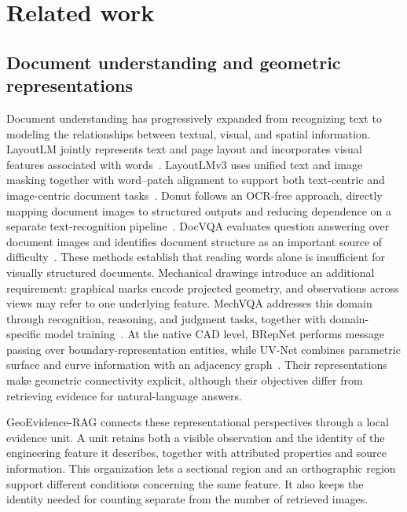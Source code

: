 \documentclass[preprint,12pt]{elsarticle}
\begin{document}
\section{Related work}
\label{sec:related_work}

\subsection{Document understanding and geometric representations}
\label{sec:related_understanding}

Document understanding has progressively expanded from recognizing text to modeling the relationships between textual, visual, and spatial information. LayoutLM jointly represents text and page layout and incorporates visual features associated with words~\cite{xu2019layoutlm}. LayoutLMv3 uses unified text and image masking together with word--patch alignment to support both text-centric and image-centric document tasks~\cite{huang2022layoutlmv3}. Donut follows an OCR-free approach, directly mapping document images to structured outputs and reducing dependence on a separate text-recognition pipeline~\cite{kim2021donut}. DocVQA evaluates question answering over document images and identifies document structure as an important source of difficulty~\cite{mathew2020docvqa}. These methods establish that reading words alone is insufficient for visually structured documents. Mechanical drawings introduce an additional requirement: graphical marks encode projected geometry, and observations across views may refer to one underlying feature. MechVQA addresses this domain through recognition, reasoning, and judgment tasks, together with domain-specific model training~\cite{kou2026mechvqa}. At the native CAD level, BRepNet performs message passing over boundary-representation entities, while UV-Net combines parametric surface and curve information with an adjacency graph~\cite{lambourne2021brepnet,jayaraman2020uvnet}. Their representations make geometric connectivity explicit, although their objectives differ from retrieving evidence for natural-language answers.

GeoEvidence-RAG connects these representational perspectives through a local evidence unit. A unit retains both a visible observation and the identity of the engineering feature it describes, together with attributed properties and source information. This organization lets a sectional region and an orthographic region support different conditions concerning the same feature. It also keeps the identity needed for counting separate from the number of retrieved images.
\end{document}
